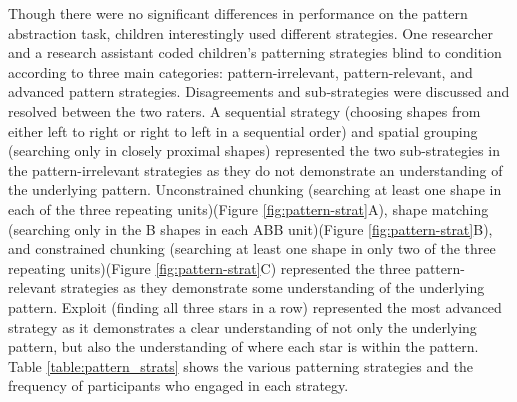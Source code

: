 Though there were no significant differences in performance on the pattern abstraction task, children interestingly used different strategies. One researcher and a research assistant coded children's patterning strategies blind to condition according to three main categories: pattern-irrelevant, pattern-relevant, and advanced pattern strategies. Disagreements and sub-strategies were discussed and resolved between the two raters. A sequential strategy (choosing shapes from either left to right or right to left in a sequential order) and spatial grouping (searching only in closely proximal shapes) represented the two sub-strategies in the pattern-irrelevant strategies as they do not demonstrate an understanding of the underlying pattern. Unconstrained chunking (searching at least one shape in each of the three repeating units)(Figure \ref{fig:pattern-strat}A), shape matching (searching only in the B shapes in each ABB unit)(Figure \ref{fig:pattern-strat}B), and constrained chunking (searching at least one shape in only two of the three repeating units)(Figure \ref{fig:pattern-strat}C) represented the three pattern-relevant strategies as they demonstrate some understanding of the underlying pattern. Exploit (finding all three stars in a row) represented the most advanced strategy as it demonstrates a clear understanding of not only the underlying pattern, but also the understanding of where each star is within the pattern. Table \ref{table:pattern_strats} shows the various patterning strategies and the frequency of participants who engaged in each strategy. 

